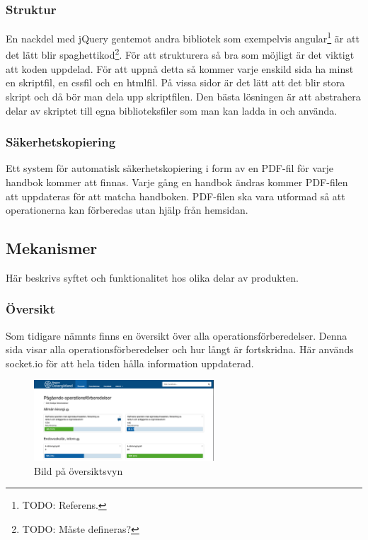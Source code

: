 \subsubsection{Struktur}
En nackdel med jQuery gentemot andra bibliotek som exempelvis angular\footnote{TODO: Referens.} är att det lätt blir spaghettikod\footnote{TODO: Måste defineras?}.
För att strukturera så bra som möjligt är det viktigt att koden uppdelad.
För att uppnå detta så kommer varje enskild sida ha minst en skriptfil, en cssfil och en htmlfil.
På vissa sidor är det lätt att det blir stora skript och då bör man dela upp skriptfilen.
Den bästa lösningen är att abstrahera delar av skriptet till egna biblioteksfiler som man kan ladda in och använda.

\subsubsection{Säkerhetskopiering}
Ett system för automatisk säkerhetskopiering i form av en PDF-fil för varje handbok kommer att finnas.
Varje gång en handbok ändras kommer PDF-filen att uppdateras för att matcha handboken.
PDF-filen ska vara utformad så att operationerna kan förberedas utan hjälp från hemsidan.

\subsection{Mekanismer}
Här beskrivs syftet och funktionalitet hos olika delar av produkten.

\subsubsection{Översikt}
Som tidigare nämnts finns en översikt över alla operationsförberedelser.
Denna sida visar alla operationsförberedelser och hur långt är fortskridna.
Här används socket.io för att hela tiden hålla information uppdaterad.

\begin{figure}
  \centering
  \includegraphics[width=0.6\textwidth]{images/site/overview.png}
  \caption{Bild på översiktsvyn}
  \label{fig:siteoverview}
\end{figure}

